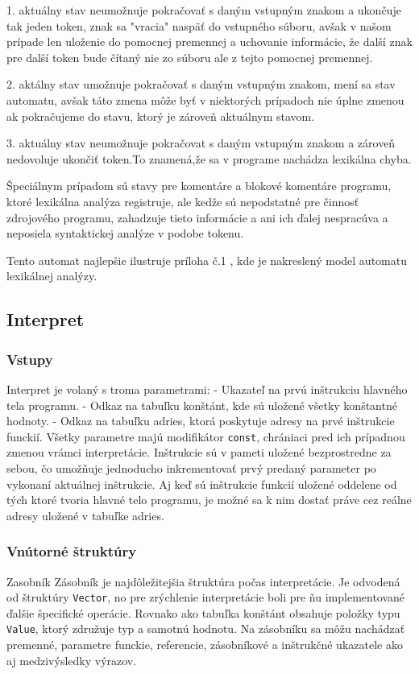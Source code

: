 \documentclass[12pt,a4paper,titlepage,final]{article}
\begin{document}
1. aktuálny stav neumožnuje pokračovať s daným vstupným znakom a ukončuje tak
jeden token, znak sa "vracia" naspäť do vstupného súboru, avšak v našom prípade
len uloženie do pomocnej premennej a uchovanie informácie, že další znak pre
další token bude čítaný nie zo súboru ale z tejto pomocnej premennej.

2. aktálny stav umožnuje pokračovať s daným vstupným znakom, mení sa stav automatu,
avšak táto zmena môže byť v niektorých prípadoch nie úplne zmenou ak pokračujeme
do stavu, ktorý je zároveň aktuálnym stavom.

3. aktuálny stav neumožnuje pokračovat s daným vstupným znakom a zároveň
nedovoluje ukončiť token.To znamená,že sa v programe nachádza lexikálna chyba.

Špeciálnym prípadom sú stavy pre komentáre a blokové komentáre programu, ktoré
lexikálna analýza registruje, ale kedže sú nepodstatné pre činnosť zdrojového
programu, zahadzuje tieto informácie a ani ich ďalej nespracúva a neposiela
syntaktickej analýze v podobe tokenu.

Tento automat najlepšie ilustruje príloha č.1 , kde je nakreslený model
automatu lexikálnej analýzy.
\newpage
\subsection{Interpret}

\subsubsection{Vstupy}
Interpret je volaný s troma parametrami:
- Ukazateľ na prvú inštrukciu hlavného tela programu.
- Odkaz na tabuľku konštánt, kde sú uložené všetky konštantné hodnoty.
- Odkaz na tabuľku adries, ktorá poskytuje adresy na prvé inštrukcie funckií.
Všetky parametre majú modifikátor \texttt{const}, chrániaci pred ich prípadnou zmenou
vrámci interpretácie. Inštrukcie sú v pameti uložené bezprostredne za sebou, čo
umožňuje jednoducho inkrementovať prvý predaný parameter po vykonaní aktuálnej
inštrukcie. Aj keď sú inštrukcie funkcií uložené oddelene od tých ktoré tvoria hlavné
telo programu, je možné sa k nim dostať práve cez reálne adresy uložené v tabuľke adries.

\subsubsection{Vnútorné štruktúry}
Zasobník
Zásobník je najdôležitejšia štruktúra počas interpretácie. Je odvodená od štruktúry
\texttt{Vector}, no pre zrýchlenie interpretácie boli pre ňu implementované ďalšie
špecifické operácie. Rovnako ako tabuľka konštánt obsahuje položky typu \texttt{Value}, 
ktorý združuje typ a samotnú hodnotu. Na zásobníku sa môžu nachádzať premenné, parametre
funckie, referencie, zásobníkové a inštrukčné ukazatele ako aj medzivýsledky výrazov.
\end{document}
